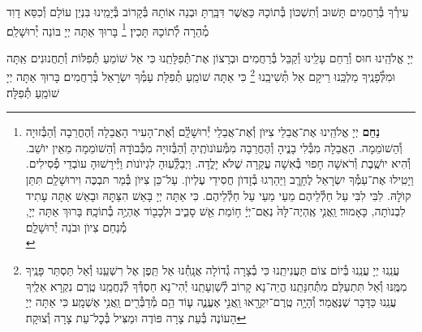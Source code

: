 \documentclass[twoside, openany, parskip=half, 11pt]{book}
\begin{document}
\amidaopening{\ayt}{}

\weekdaysakedusha \vspace{0.5\baselineskip}

\sepline

\weekdaysabinah

\weekdaysateshuva

\weekdaysaselichah

\weekdaysageulah

\weekdaysaanneinu

\weekdaysarefuah

\weekdaysaberacha

\weekdaysashofar

\weekdaysamishpat

\weekdaysaminim

\weekdaysatzadikim

עִירְ֯ךָ בְּ֯רַחֲמִים תָּשׁוּב וְ֯תִשְׁכּוֹן בְּ֯תוֹכָהּ כַּאֲשֶׁר דִּבַּֽרְתָּ וּבְנֵה אוֹתָהּ בְּ֯קָרוֹב בְּ֯יָמֵֽינוּ בִּנְיַן עוֹלָם וְ֯כִסֵּא דָוִד מְ֯הֵרָה לְ֯תוֹכָהּ תָּכִין׃
\footnote{
\textbf{נַחֵם}
יְיָ אֱלֹהֵֽינוּ אֶת־אֲבֵלֵי צִיּוֺן וְ֯אֶת־אֲבֵלֵי יְ֯רוּשָׁלַֽ֔֗͏ִם וְ֯אֶת־הָעִיר הָאֲבֵלָה וְ֯הֶחֳרֵבָה וְ֯הַבְּ֯זוּיָה וְ֯הַשׁוֺמֵמָה. הָאֲבֵלָה מִבְּ֯לִי בָנֱיהָ וְ֯הֶחֳרֵבָה מִמְּ֯עוֺנוֺתֶֽיהָ וְ֯הַבְּ֯זוּיָה מִכְּ֯בוֺדׇהּ וְ֯הַשׁוֺמֵמָה מֵאֵין יוֺשֵׁב. וְ֯הִיא יוֺשֶֽׁבֶת וְ֯רֹאשָׁה חָפוּי בְּ֯אִשָׁה עֲקַרָה שֶׁלֹּא יָלֳדָה. וַיְבַלְְּ֯עֽוּהָ לִגְיוֺנוֺת וַיְּ֯ירָשׁוּהָ עוֺבְדֵי פְ֯סִילִים. וַיָטִֽילוּ אֶת־עַמְּ֯ךָ יִשְׂרָאֵל לֶחָרֱֽב וַיַּהַרְגוּ בְ֯זָדוֺן חֲסִידֵי עֶלְיוֺן. עַל־כֵּן צִיּוֺן בְּ֯מַר תּבְכֶּה וִירוּשָׁלַֽ͏ִם תִּתֵּן קוֺלׇהּ. לִבִּי לִבִּי עַל חַלְ֯לֵיהֶם מֵעַי מֵעַי עַל חַלְ֯לֵיהֶם. כִּי אַתָּה יְיָ בָּאֵשׁ הִצַּתׇּהּ וּבָאֵשׁ אַתָּה עָתִיד לִבְנוֺתָה, כָּאָמוּר׃ וַֽאֲנִ֤י אֶֽהְיֶה־לָּהּ֙ נְאֻם־יְיָ֔ ח֥וֹמַת אֵ֖שׁ סָבִ֑יב וּלְכָב֖וֹד אֶהְיֶ֥ה בְ֯תוֹכָֽהּ׃
בָּרוּךְ אַתָּה יְיָ, מְ֯נַחֵם צִיוֺן וּבֹנֵה יְ֯רוּשָׁלַֽ͏ִם׃ \\
}
בָּרוּךְ אַתָּה יְיָ בּוֹנֵה יְ֯רוּשָׁלַ‍ִם׃

\weekdaysamalchus

יְיָ אֱלֹהֵֽינוּ חוּס וְ֯רַחֵם עָלֵֽינוּ וְ֯קַבֵּל בְּ֯רַחֲמִים וּבְרָצוֹן אֶת־תְּ֯פִלָּתֵֽנוּ כִּי אֵל שׁוֹמֵעַ תְּ֯פִלּוֹת וְ֯תַחֲנוּנִים אַֽתָּה וּמִלְּ֯פָנֶֽיךָ מַלְכֵּֽנוּ רֵיקָם אַל תְּ֯שִׁיבֵֽנוּ
\footnote{
עֲנֵֽנוּ יְיָ עֲנֵֽנוּ בְּ֯יוֹם צוֹם תַּעֲנִיתֵֽנוּ כִּי בְ֯צָרָה גְ֯דוֹלָה אֲנָֽחְ֯נוּ אַל תֵּֽפֶן אֶל רִשְׁעֵֽנוּ וְ֯אַל תַּסְתֵּר פָּנֶֽיךָ מִמֶּֽנּוּ וְ֯אַל תִּתְעַלַּם מִתְּ֯חִנָּתֵֽנוּ׃ הֱיֵה־נָא קָרוֹב לְ֯שַׁוְעָתֵֽנוּ יְ֯הִי־נָא חַסְדְּ֯ךָ לְ֯נַחֲמֵֽנוּ טֶֽרֶם נִקְרָא אֵלֶֽיךָ עֲנֵֽנוּ כַּדָּבָר שֶׁנֶּאֱמַר׃
וְ֯הָיָ֥ה טֶֽרֶם־יִקְרָ֖אוּ וַֽאֲנִ֣י אֶעֱנֶ֑ה ע֛וֹד הֵ֥ם מְ֯דַבְּ֯רִ֖ים וַֽאֲנִ֥י אֶשְׁמָֽע׃ כִּי אַתָּה יְיָ הָעוֹנֶה בְּ֯עֵת צָרָה פּוֹדֶה וּמַצִּיל בְּ֯כׇל־עֵת צָרָה וְ֯צוּקָה׃
}
כִּי אַתָּה שׁוֹמֵֽעַ תְּ֯פִלַּת עַמְּ֯ךָ יִשְׂרָאֵל בְּ֯רַחֲמִים׃ בָּרוּךְ אַתָּה יְיָ שׁוֹמֵֽעַ תְּ֯פִלָּה׃
\end{document}
